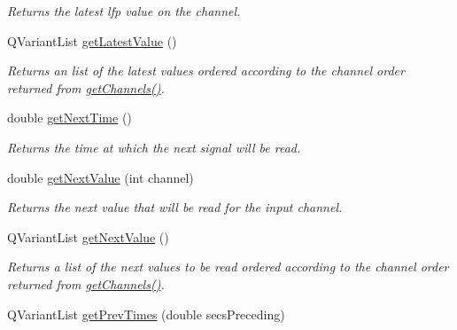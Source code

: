 \begin{DoxyCompactItemize}
\begin{DoxyCompactList}\small\item\em Returns the latest lfp value on the channel. \end{DoxyCompactList}\item 
\hypertarget{class_picto_1_1_analysis_lfp_data_af9504f04d9fd580c16ba036f59fc7562}{Q\-Variant\-List \hyperlink{class_picto_1_1_analysis_lfp_data_af9504f04d9fd580c16ba036f59fc7562}{get\-Latest\-Value} ()}\label{class_picto_1_1_analysis_lfp_data_af9504f04d9fd580c16ba036f59fc7562}

\begin{DoxyCompactList}\small\item\em Returns an list of the latest values ordered according to the channel order returned from \hyperlink{class_picto_1_1_analysis_lfp_data_ad3060e0658f2d7ca36e55fba037cd0ed}{get\-Channels()}. \end{DoxyCompactList}\item 
double \hyperlink{class_picto_1_1_analysis_lfp_data_a4a21df0d975fd34773346f5ef832eec0}{get\-Next\-Time} ()
\begin{DoxyCompactList}\small\item\em Returns the time at which the next signal will be read. \end{DoxyCompactList}\item 
double \hyperlink{class_picto_1_1_analysis_lfp_data_aeb704a3b56e2249498cc9d980c7f80c0}{get\-Next\-Value} (int channel)
\begin{DoxyCompactList}\small\item\em Returns the next value that will be read for the input channel. \end{DoxyCompactList}\item 
Q\-Variant\-List \hyperlink{class_picto_1_1_analysis_lfp_data_a6300e10202a9ad223471fe7dcd66e410}{get\-Next\-Value} ()
\begin{DoxyCompactList}\small\item\em Returns a list of the next values to be read ordered according to the channel order returned from \hyperlink{class_picto_1_1_analysis_lfp_data_ad3060e0658f2d7ca36e55fba037cd0ed}{get\-Channels()}. \end{DoxyCompactList}\item 
\hypertarget{class_picto_1_1_analysis_lfp_data_acc674aa0cc3c61731a500372294b6f8b}{Q\-Variant\-List \hyperlink{class_picto_1_1_analysis_lfp_data_acc674aa0cc3c61731a500372294b6f8b}{get\-Prev\-Times} (double secs\-Preceding)}\label{class_picto_1_1_analysis_lfp_data_acc674aa0cc3c61731a500372294b6f8b}


\end{DoxyCompactItemize}
